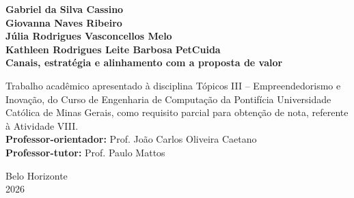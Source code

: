 \begin{titlepage}
\begin{center}
\textbf{Gabriel da Silva Cassino}\\
\textbf{Giovanna Naves Ribeiro}\\
\textbf{Júlia Rodrigues Vasconcellos Melo}\\
\textbf{Kathleen Rodrigues Leite Barbosa}
\vfill
{\Large\textbf{PetCuida}}\\[0.25cm]
{\Large\textbf{Canais, estratégia e alinhamento com a proposta de valor}}
\end{center}
\vspace{1.5cm}
\begin{flushright}
\begin{minipage}{0.55\textwidth}
\small Trabalho acadêmico apresentado à disciplina Tópicos III -- Empreendedorismo e Inovação, do Curso de Engenharia de Computação da Pontifícia Universidade Católica de Minas Gerais, como requisito parcial para obtenção de nota, referente à Atividade VIII.\\[0.4cm]
\textbf{Professor-orientador:} Prof. João Carlos Oliveira Caetano\\
\textbf{Professor-tutor:} Prof. Paulo Mattos
\end{minipage}
\end{flushright}
\vfill
\begin{center}Belo Horizonte\\2026\end{center}
\end{titlepage}
\tableofcontents
\newpage
